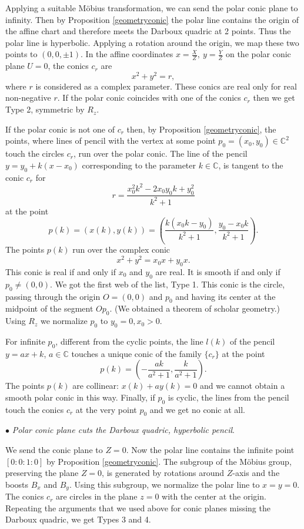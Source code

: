 \documentclass[11pt,a4paper]{article}
\begin{document}
 \smallskip  
 
 
 
Applying a suitable M\" obius transformation, we can send the polar conic plane to infinity. Then by Proposition \ref{geometryconic}  the  polar line contains the origin of the affine chart and therefore meets the Darboux quadric at 2 points. Thus the polar line is hyperbolic. Applying a rotation around the origin, we map these two points to $(0,0,\pm 1)$.   In the affine coordinates $x=\frac{X}{Z},\ y=\frac{Y}{Z}$ on the polar conic plane $U=0$, the conics $c_r$ are 
$$
x^2+y^2=r, 
$$
where $r$ is considered as a complex parameter. These conics are real only for real non-negative $r$. 
If the polar conic coincides with one of the conics $c_r$ then we get Type 2, symmetric by $R_z$. 

If the polar conic is not one of $c_r$  then, by Proposition \ref{geometryconic}, the points, where lines of pencil with the vertex at   some point $p_0=(x_0,y_0)\in \mathbb C^2$ touch the circles $c_r$,  run over the polar conic. The line of the pencil $y=y_0+k(x-x_0)$ corresponding to the parameter $k\in \mathbb C$, is tangent to the conic $c_r$  for 
$$
r=\frac{x_0^2k^2 - 2x_0y_0k + y_0^2}{k^2 + 1}
$$  
at the point 
$$
p(k)=(x(k),y(k))=\left(\frac{k(x_0k - y_0)}{k^2 + 1},\frac{y_0-x_0k}{k^2 + 1} \right). 
$$
The points $p(k)$ run over the complex conic
$$
x^2+y^2 =x_0x + y_0x. 
$$
 This conic is real if and only if $x_0$ and $y_0$ are real. It is smooth if and only if $p_0\ne (0,0)$. We got the first web of the list, Type 1. This conic is the circle, passing through the origin $O=(0,0)$ and $p_0$ and having its center at the midpoint of the segment $Op_0$. 
(We obtained a theorem of scholar geometry.) Using $R_z$ we normalize  $p_0$ to $y_0=0,x_0>0$. 
 
 For infinite $p_0$, different from the cyclic points,  the line $l(k)$ of the pencil $y=ax+k$, $a\in \mathbb C$ touches a unique conic of the family $\{c_r\}$ at the point 
$$
p(k)=\left(-\frac{ak}{a^2 + 1}, \frac{k}{a^2 + 1}\right). 
$$  
The points $p(k)$ are collinear: $x(k)+ay(k)=0$ and we cannot obtain a smooth polar conic in this way. Finally, if $p_0$ is cyclic, the lines from the pencil touch the conics $c_r$ at the very point $p_0$ and we get no conic at all. 

\smallskip 
$\bullet${ \it Polar conic plane cuts the Darboux quadric, hyperbolic pencil}.

\smallskip 

We send the conic plane to  $Z=0$.   Now the polar line contains the infinite point $[0:0:1:0]$ by Proposition \ref{geometryconic}. The subgroup of the M\" obius group, preserving the plane $Z=0$, is generated by rotations around $Z$-axis and the boosts $B_x$ and $B_y$. Using this subgroup, we normalize the polar line to $x=y=0$.  The conics $c_r$ are circles in the plane $z=0$ with the center at the origin. Repeating the arguments that we used above for conic planes missing the Darboux quadric, we get Types 3 and 4. 
\end{document}
